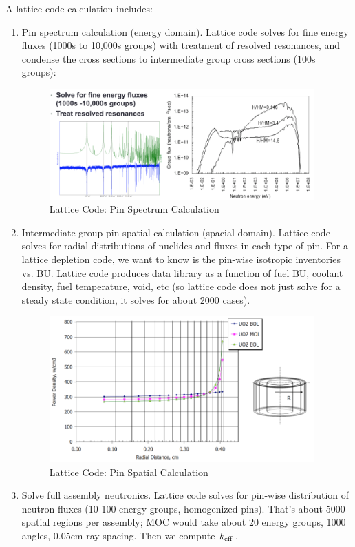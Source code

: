 \documentclass{school-22.211-notes}
\begin{document}
A lattice code calculation includes:
\begin{enumerate}
\item Pin spectrum calculation (energy domain). Lattice code solves for fine energy fluxes (1000s to 10,000s groups) with treatment of resolved resonances, and condense the cross sections to intermediate group cross sections (100s groups): 
\begin{figure}[ht]
  \centering
  \includegraphics[width=4in]{images/design/lattice-energy.png}
  \caption{Lattice Code: Pin Spectrum Calculation} \label{lattice-energy}
\end{figure}

\item Intermediate group pin spatial calculation (spacial domain). Lattice code solves for radial distributions of nuclides and fluxes in each type of pin. For a lattice depletion code, we want to know is the pin-wise isotropic inventories vs. BU. Lattice code produces data library as a function of fuel BU, coolant density, fuel temperature, void, etc (so lattice code does not just solve for a steady state condition, it solves for about 2000 cases). 
\begin{figure}[ht]
  \centering
  \includegraphics[width=4in]{images/design/lattice-space.png}
  \caption{Lattice Code: Pin Spatial Calculation} \label{lattice-space}
\end{figure}

\item Solve full assembly neutronics. Lattice code solves for pin-wise distribution of neutron fluxes (10-100 energy groups, homogenized pins). That's about 5000 spatial regions per assembly; MOC would take about 20 energy groups, 1000 angles, 0.05cm ray spacing. Then we compute $\left. k_{\mathrm{eff}} \right.$. 
\end{enumerate}
\end{document}
